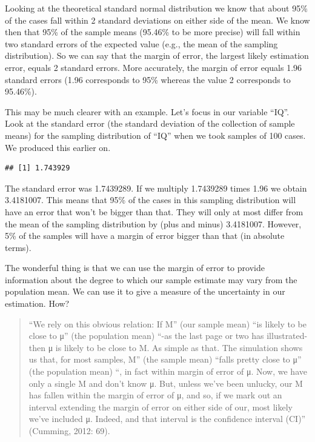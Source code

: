 \documentclass[
]{book}
\newenvironment{Shaded}{\begin{snugshade}}{\end{snugshade}}
\newcommand{\AttributeTok}[1]{\textcolor[rgb]{0.77,0.63,0.00}{#1}}
\newcommand{\FunctionTok}[1]{\textcolor[rgb]{0.00,0.00,0.00}{#1}}
\newcommand{\NormalTok}[1]{#1}
\newcommand{\OtherTok}[1]{\textcolor[rgb]{0.56,0.35,0.01}{#1}}
\newcommand{\SpecialCharTok}[1]{\textcolor[rgb]{0.00,0.00,0.00}{#1}}
\begin{document}
Looking at the theoretical standard normal distribution we know that about 95\% of the cases fall within 2 standard deviations on either side of the mean. We know then that 95\% of the sample means (95.46\% to be more precise) will fall within two standard errors of the expected value (e.g., the mean of the sampling distribution). So we can say that the margin of error, the largest likely estimation error, equals 2 standard errors. More accurately, the margin of error equals 1.96 standard errors (1.96 corresponds to 95\% whereas the value 2 corresponds to 95.46\%).

This may be much clearer with an example. Let's focus in our variable ``IQ''. Look at the standard error (the standard deviation of the collection of sample means) for the sampling distribution of ``IQ'' when we took samples of 100 cases. We produced this earlier on.

\begin{Shaded}
\end{Shaded}

\begin{verbatim}
## [1] 1.743929
\end{verbatim}

The standard error was 1.7439289. If we multiply 1.7439289 times 1.96 we obtain 3.4181007. This means that 95\% of the cases in this sampling distribution will have an error that won't be bigger than that. They will only at most differ from the mean of the sampling distribution by (plus and minus) 3.4181007. However, 5\% of the samples will have a margin of error bigger than that (in absolute terms).

The wonderful thing is that we can use the margin of error to provide information about the degree to which our sample estimate may vary from the population mean. We can use it to give a measure of the uncertainty in our estimation. How?

\begin{quote}
``We rely on this obvious relation: If M'' (our sample mean) ``is likely to be close to μ'' (the population mean) ``-as the last page or two has illustrated- then μ is likely to be close to M. As simple as that. The simulation shows us that, for most samples, M'' (the sample mean) ``falls pretty close to μ'' (the population mean) ``, in fact within margin of error of μ. Now, we have only a single M and don't know μ. But, unless we've been unlucky, our M has fallen within the margin of error of μ, and so, if we mark out an interval extending the margin of error on either side of our, most likely we've included μ. Indeed, and that interval is the confidence interval (CI)'' (Cumming, 2012: 69).
\end{quote}
\end{document}
